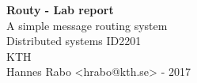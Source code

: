 \begin{titlepage}
	\thispagestyle{empty}
	
	\begin{center}
	  \vspace*{5cm}
	  
	  \huge{\textbf{Routy - Lab report}}\\
	  \vspace{.5cm}
	  \Large{A simple message routing system}\\
	  \vspace{2.5cm}
	  \normalsize Distributed systems ID2201\\
	  \vspace{2mm}		
	  \Large{KTH}\\
	  \vspace{6.5cm} 
	  \normalsize Hannes Rabo <hrabo@kth.se> - 2017 
	\end{center} 
	
\end{titlepage}